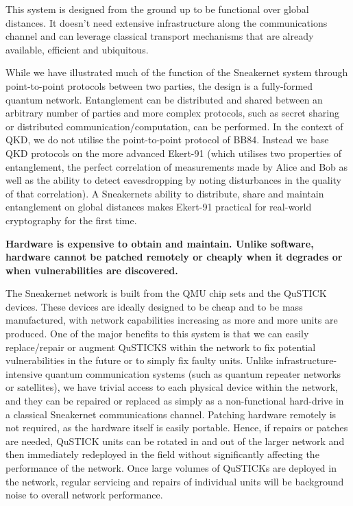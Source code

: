 \documentclass[twocolumn, aps, rmp, amsmath, amssymb, nofootinbib, superscriptaddress, longbibliography, floatfix, table-of-contents, eqsecnum]{revtex4-2}
\begin{document}
This system is designed from the ground up to be functional over global distances. It doesn't need extensive infrastructure along the communications channel and can leverage classical transport mechanisms that are already available, efficient and ubiquitous. 

While we have illustrated much of the function of the Sneakernet system through point-to-point protocols between two parties, the design is a fully-formed quantum network. Entanglement can be distributed and shared between an arbitrary number of parties and more complex protocols, such as secret sharing or distributed communication/computation, can be performed. In the context of QKD, we do not utilise the point-to-point protocol of BB84. Instead we base QKD protocols on the more advanced Ekert-91 (which utilises two properties of entanglement, the perfect correlation of measurements made by Alice and Bob as well as the ability to detect eavesdropping by noting disturbances in the quality of that correlation). A Sneakernets ability to distribute, share and maintain entanglement on global distances makes Ekert-91 practical for real-world cryptography for the first time.

\textbf{Hardware is expensive to obtain and maintain. Unlike software, hardware cannot be patched remotely or cheaply when it degrades or when vulnerabilities are discovered.}

The Sneakernet network is built from the QMU chip sets and the QuSTICK devices. These devices are ideally designed to be cheap and to be mass manufactured, with network capabilities increasing as more and more units are produced. One of the major benefits to this system is that we can easily replace/repair or augment QuSTICKS within the network to fix potential vulnerabilities in the future or to simply fix faulty units. Unlike infrastructure-intensive quantum communication systems (such as quantum repeater networks or satellites), we have trivial access to each physical device within the network, and they can be repaired or replaced as simply as a non-functional hard-drive in a classical Sneakernet communications channel. Patching hardware remotely is not required, as the hardware itself is easily portable. Hence, if repairs or patches are needed, QuSTICK units can be rotated in and out of the larger network and then immediately redeployed in the field without significantly affecting the performance of the network. Once large volumes of QuSTICKs are deployed in the network, regular servicing and repairs of individual units will be background noise to overall network performance.  
\end{document}
